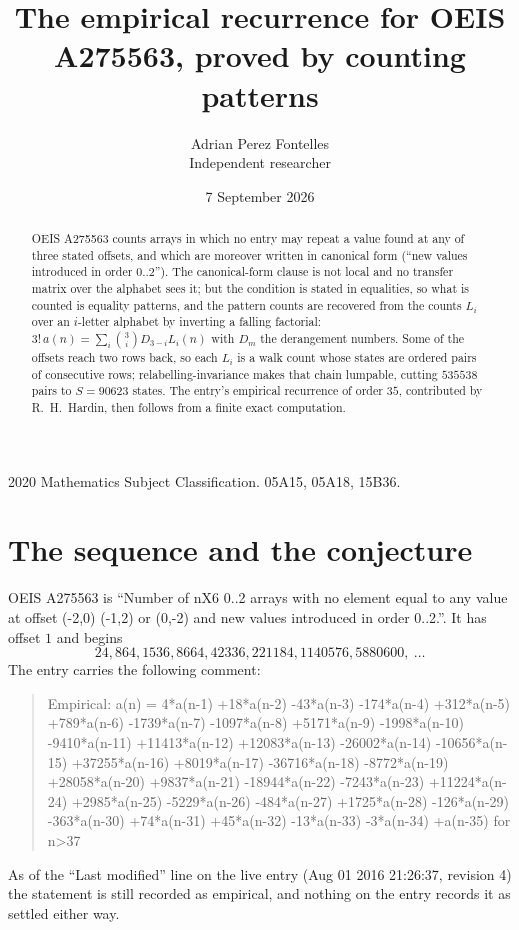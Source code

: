 \documentclass[11pt,a4paper]{article}
\title{The empirical recurrence for OEIS A275563, proved by counting patterns}
\author{Adrian Perez Fontelles\\ \small Independent researcher}
\date{7 September 2026}
\theoremstyle{plain}
\theoremstyle{definition}
\begin{document}
\maketitle

\begin{abstract}
OEIS A275563 counts arrays in which no entry may repeat a value found at any of three stated
offsets, and which are moreover written in canonical form (``new values introduced in order
$0..2$''). The canonical-form clause is not local and no transfer matrix over the
alphabet sees it; but the condition is stated in equalities, so what is counted is equality
patterns, and the pattern counts are recovered from the counts $L_i$ over an $i$-letter
alphabet by inverting a falling factorial:
$3!\,a(n)=\sum_i\binom{3}{i}D_{3-i}L_i(n)$ with $D_m$ the derangement numbers.
Some of the offsets reach two rows back, so each $L_i$ is a walk count whose states are
ordered pairs of consecutive rows; relabelling-invariance makes that chain lumpable,
cutting $535538$ pairs to $S=90623$ states. The entry's empirical recurrence of order $35$,
contributed by R.~H.~Hardin, then follows from a finite exact computation.
\end{abstract}

\noindent\small 2020 Mathematics Subject Classification. 05A15, 05A18, 15B36.\normalsize

\section{The sequence and the conjecture}

OEIS A275563 is ``Number of nX6 0..2 arrays with no element equal to any value at offset (-2,0) (-1,2) or (0,-2) and new values introduced in order 0..2.''. It has offset $1$ and begins
\[
24, 864, 1536, 8664, 42336, 221184, 1140576, 5880600,\ \dots
\]
The entry carries the following comment:
\begin{quote}\small
Empirical: a(n) = 4*a(n-1) +18*a(n-2) -43*a(n-3) -174*a(n-4) +312*a(n-5) +789*a(n-6) -1739*a(n-7) -1097*a(n-8) +5171*a(n-9) -1998*a(n-10) -9410*a(n-11) +11413*a(n-12) +12083*a(n-13) -26002*a(n-14) -10656*a(n-15) +37255*a(n-16) +8019*a(n-17) -36716*a(n-18) -8772*a(n-19) +28058*a(n-20) +9837*a(n-21) -18944*a(n-22) -7243*a(n-23) +11224*a(n-24) +2985*a(n-25) -5229*a(n-26) -484*a(n-27) +1725*a(n-28) -126*a(n-29) -363*a(n-30) +74*a(n-31) +45*a(n-32) -13*a(n-33) -3*a(n-34) +a(n-35) for n>37
\end{quote}
As of the ``Last modified'' line on the live entry (Aug 01 2016 21:26:37, revision 4) the statement is
still recorded as empirical, and nothing on the entry records it as settled either way.
\end{document}
